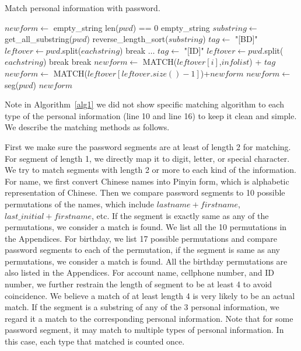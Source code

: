 \begin{algorithm}[h!]
\caption{Match personal information with password.}
\label{alg1}
\begin{algorithmic}[1]
\State $newform \gets$ empty\_string
\If len($pwd$) == 0
\State \Return empty\_string
\EndIf
\State $substring \gets$ get\_all\_substring($pwd$)
\State reverse\_length\_sort($substring$)
\State $tag \gets $ "[BD]"
\State $leftover \gets pwd$.split($eachstring$)
\State break
\EndIf
\State $\ldots$
\State $tag \gets$ "[ID]"
\State $leftover \gets pwd$.split($eachstring$)
\State break
\EndIf
\Else
\State break
\EndIf
\EndFor
{}
\State $newform \gets$ MATCH($leftover[i]$,$infolist$) + $tag$
\EndFor
\State $newform \gets$  MATCH($leftover[leftover.size()-1]$)+$newform$
\Else
\State $newform \gets$ seg($pwd$)
\EndIf
\State \Return $newform$
\EndProcedure
\end{algorithmic}
\end{algorithm}

Note in Algorithm~\ref{alg1} we did not show specific matching algorithm to each type of the personal information (line 10 and line 16) to keep it clean and simple. We describe the matching methods as follows.

First we make sure the password segments are at least of length 2 for matching. For segment of length 1, we directly map it to digit, letter, or special character. We try to match segments with length 2 or more to each kind of the information. For name, we first convert Chinese names into Pinyin form, which is alphabetic representation of Chinese. Then we compare password segments to 10 possible permutations of the names, which include $lastname + firstname$, $last\_initial+firstname$, etc. If the segment is exactly same as any of the permutations, we consider a match is found. We list all the 10 permutations in the Appendices. For birthday, we list 17 possible permutations and compare password segments to each of the permutation, if the segment is same as any permutations, we consider a match is found. All the birthday permutations are also listed in the Appendices. For account name, cellphone number, and ID number, we further restrain the length of segment to be at least 4 to avoid coincidence. We believe a match of at least length 4 is very likely to be an actual match. If the segment is a substring of any of the 3 personal information, we regard it a match to the corresponding personal information. Note that for some password segment, it may match to multiple types of personal information. In this case, each type that matched is counted once.


